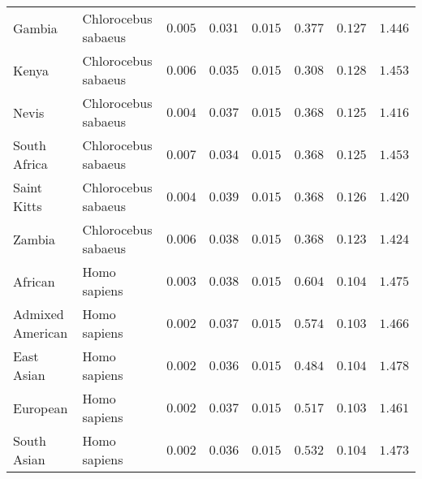 \documentclass{article}
\begin{document}
\begin{center}
\begin{longtable}{|l|l|r|r|r|r|r|r|}
            Gambia               & Chlorocebus sabaeus & $ 0.005$        & $ 0.031$                   & $ 0.015$                      & $ 0.377$                             & $ 0.127$                      & $ 1.446$           \\
            Kenya                & Chlorocebus sabaeus & $ 0.006$        & $ 0.035$                   & $ 0.015$                      & $ 0.308$                             & $ 0.128$                      & $ 1.453$           \\
            Nevis                & Chlorocebus sabaeus & $ 0.004$        & $ 0.037$                   & $ 0.015$                      & $ 0.368$                             & $ 0.125$                      & $ 1.416$           \\
            South Africa         & Chlorocebus sabaeus & $ 0.007$        & $ 0.034$                   & $ 0.015$                      & $ 0.368$                             & $ 0.125$                      & $ 1.453$           \\
            Saint Kitts          & Chlorocebus sabaeus & $ 0.004$        & $ 0.039$                   & $ 0.015$                      & $ 0.368$                             & $ 0.126$                      & $ 1.420$           \\
            Zambia               & Chlorocebus sabaeus & $ 0.006$        & $ 0.038$                   & $ 0.015$                      & $ 0.368$                             & $ 0.123$                      & $ 1.424$           \\
            African              & Homo sapiens        & $ 0.003$        & $ 0.038$                   & $ 0.015$                      & $ 0.604$                             & $ 0.104$                      & $ 1.475$           \\
            Admixed American     & Homo sapiens        & $ 0.002$        & $ 0.037$                   & $ 0.015$                      & $ 0.574$                             & $ 0.103$                      & $ 1.466$           \\
            East Asian           & Homo sapiens        & $ 0.002$        & $ 0.036$                   & $ 0.015$                      & $ 0.484$                             & $ 0.104$                      & $ 1.478$           \\
            European             & Homo sapiens        & $ 0.002$        & $ 0.037$                   & $ 0.015$                      & $ 0.517$                             & $ 0.103$                      & $ 1.461$           \\
            South Asian          & Homo sapiens        & $ 0.002$        & $ 0.036$                   & $ 0.015$                      & $ 0.532$                             & $ 0.104$                      & $ 1.473$           \\
        \end{longtable}
    \end{center}
\end{document}
